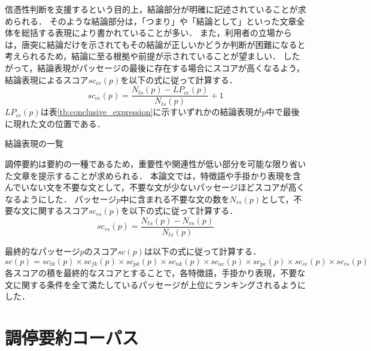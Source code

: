 \documentclass[japanese]{jnlp_1.4}
\begin{document}
信憑性判断を支援するという目的上，結論部分が明確に記述されていることが求められる．
そのような結論部分は，「つまり」や「結論として」といった文章全体を総括する表現により書かれていることが多い．
また，利用者の立場からは，唐突に結論だけを示されてもその結論が正しいかどうか判断が困難になると考えられるため，結論に至る根拠や前提が示されていることが望ましい．
したがって，結論表現がパッセージの最後に存在する場合にスコアが高くなるよう，結論表現によるスコア$sc_{ce}(p)$を以下の式に従って計算する．
\begin{equation}
sc_{ce}(p)=\frac{N_{ts}(p)-LP_{ce}(p)}{N_{ts}(p)}+1
\end{equation}
$LP_{ce}(p)$は表\ref{tb:conclusive_expression}に示すいずれかの結論表現が$p$中で最後に現れた文の位置である．

\begin{table}[t]
 \caption{結論表現の一覧}
 \label{tb:conclusive_expression}

\end{table}

調停要約は要約の一種であるため，重要性や関連性が低い部分を可能な限り省いた文章を提示することが求められる．
本論文では，特徴語や手掛かり表現を含んでいない文を不要な文として，不要な文が少ないパッセージほどスコアが高くなるようにした．
パッセージ$p$中に含まれる不要な文の数を$N_{rs}(p)$として，不要な文に関するスコア$sc_{rs}(p)$を以下の式に従って計算する．
\begin{equation}
sc_{rs}(p)=\frac{N_{ts}(p)-N_{rs}(p)}{N_{ts}(p)}
\end{equation}

最終的なパッセージ$p$のスコア$sc(p)$は以下の式に従って計算する．
\begin{equation}
sc(p)=sc_{tk}(p) \times sc_{fk}(p) \times sc_{pk}(p) \times sc_{nk}(p) \times sc_{ae}(p) \times sc_{pe}(p) \times sc_{ce}(p) \times sc_{rs}(p)
	\label{eq:final_score}
\end{equation}
各スコアの積を最終的なスコアとすることで，各特徴語，手掛かり表現，不要な文に関する条件を全て満たしているパッセージが上位にランキングされるようにした．



\section{調停要約コーパス}
\label{sc:corpus}
\end{document}
